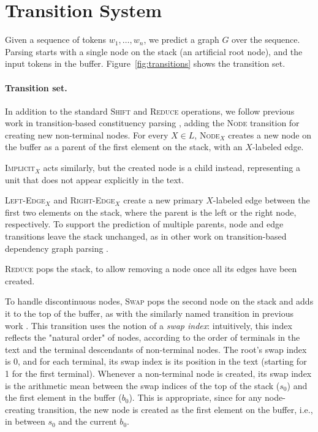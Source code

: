 \documentclass[11pt,a4paper]{article}
\newcommand{\figref}[1]{Figure~\ref{#1}}
\begin{document}
\section{Transition System}\label{sec:system}

Given a sequence of tokens $w_1, \ldots, w_n$, we predict a graph $G$ over the sequence.
Parsing starts with a single node on the stack (an artificial root node), and the input tokens
in the buffer. \figref{fig:transitions} shows the transition set.

\paragraph{Transition set.}
In addition to the standard \textsc{Shift} and \textsc{Reduce} operations, 
we follow previous work in transition-based constituency parsing \cite{sagae2005classifier},
adding the \textsc{Node} transition for creating new non-terminal nodes.
For every $X\in L$,
\textsc{Node$_X$} creates a new node on the buffer as a parent of the first element on the stack, with an $X$-labeled edge.

\textsc{Implicit$_X$} acts similarly, but the created node is a child instead,
representing a unit that does not appear explicitly in the text.

\textsc{Left-Edge$_X$} and \textsc{Right-Edge$_X$} create a new primary $X$-labeled edge
between the first two elements on the stack,
where the parent is the left or the right node, respectively.
To support the prediction of multiple parents, node and edge transitions
leave the stack unchanged, as in other work on
transition-based dependency graph parsing
\cite{sagae2008shift,ribeyre-villemontedelaclergerie-seddah:2014:SemEval,tokgoz2015transition}.

\textsc{Reduce} pops the stack, to allow removing a node
once all its edges have been created.

To handle discontinuous nodes, \textsc{Swap} pops the second
node on the stack and adds it to the top of the buffer, as with the similarly
named transition in previous work \cite{nivre2009non,maier2015discontinuous}.
This transition uses the notion of a \textit{swap index}:
intuitively, this index reflects the "natural order" of nodes,
according to the order of terminals in the text and the terminal descendants of non-terminal nodes.
The root's swap index is 0, and for each terminal, its swap index is its position in the text
(starting for 1 for the first terminal).
Whenever a non-terminal node is created, its swap index is the arithmetic mean between
the swap indices of the top of the stack ($s_0$) and the first element in the buffer ($b_0$).
This is appropriate, since for any node-creating transition, the new node is created
as the first element on the buffer, i.e., in between $s_0$ and the current $b_0$.
\end{document}

